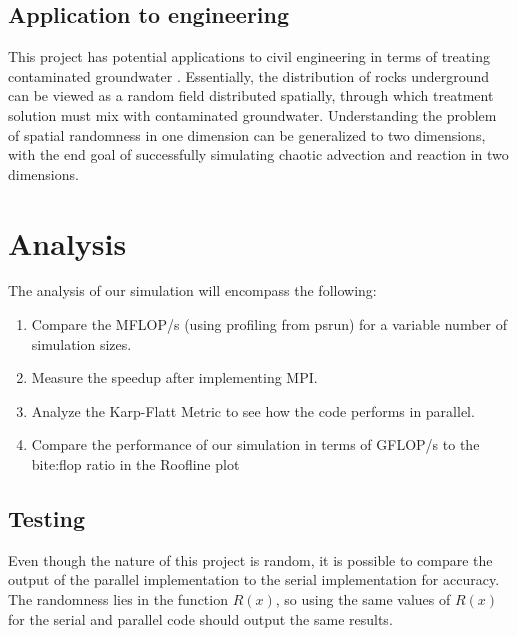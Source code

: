 \documentclass[12pt]{article}
\newcommand{\be}{\begin{enumerate}}
\newcommand{\ee}{\end{enumerate}}
\begin{document}
\subsection{Application to engineering}
This project has potential applications to civil engineering in terms
of treating contaminated groundwater \cite{neupauer}. Essentially, the
distribution of rocks underground can be viewed as a random field
distributed spatially, through which treatment solution must mix with
contaminated groundwater. Understanding the problem of spatial
randomness in one dimension can be generalized to two dimensions, with
the end goal of successfully simulating chaotic advection and reaction in two dimensions. 

\section{Analysis}
The analysis of our simulation will encompass the following:
\be
\item Compare the MFLOP/s (using profiling from psrun) for a variable number of simulation
sizes. 
\item Measure the speedup after implementing MPI. 
\item Analyze the Karp-Flatt Metric to see how the code
  performs in parallel. 
\item Compare the performance of our simulation in terms of GFLOP/s to
  the bite:flop ratio in the Roofline plot
\ee

\subsection{Testing}
Even though the nature of this project is random, it is possible to
compare the output of the parallel implementation to the serial
implementation for accuracy. The randomness lies in the function
$R(x)$, so using the same values of $R(x)$ for the serial and parallel
code should output the same results.




\end{document}
